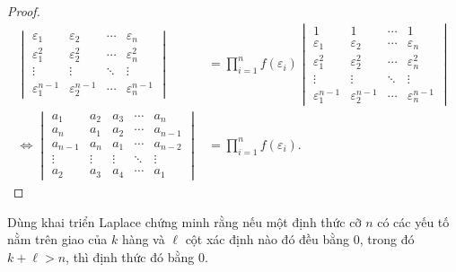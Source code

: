 \documentclass[class=linearalgebra,crop=false]{standalone}
\begin{document}
\begin{proof}
\begin{align*}
\begin{vmatrix}
            \varepsilon_{1}       & \varepsilon_{2}       & \cdots & \varepsilon_{n}       \\
            \varepsilon_{1}^{2}   & \varepsilon_{2}^{2}   & \cdots & \varepsilon_{n}^{2}   \\
            \vdots                & \vdots                & \ddots & \vdots                \\
            \varepsilon_{1}^{n-1} & \varepsilon_{2}^{n-1} & \cdots & \varepsilon_{n}^{n-1}
        \end{vmatrix}
         & =
        \prod^{n}_{i=1}f(\varepsilon_{i})
        \begin{vmatrix}
            1                     & 1                     & \cdots & 1                     \\
            \varepsilon_{1}       & \varepsilon_{2}       & \cdots & \varepsilon_{n}       \\
            \varepsilon_{1}^{2}   & \varepsilon_{2}^{2}   & \cdots & \varepsilon_{n}^{2}   \\
            \vdots                & \vdots                & \ddots & \vdots                \\
            \varepsilon_{1}^{n-1} & \varepsilon_{2}^{n-1} & \cdots & \varepsilon_{n}^{n-1}
        \end{vmatrix} \\
        \Leftrightarrow
        \begin{vmatrix}
            a_{1}   & a_{2}  & a_{3}  & \cdots & a_{n}   \\
            a_{n}   & a_{1}  & a_{2}  & \cdots & a_{n-1} \\
            a_{n-1} & a_{n}  & a_{1}  & \cdots & a_{n-2} \\
            \vdots  & \vdots & \vdots & \ddots & \vdots  \\
            a_{2}   & a_{3}  & a_{4}  & \cdots & a_{1}
        \end{vmatrix}
         & =
        \prod^{n}_{i=1}f(\varepsilon_{i}).
    \end{align*}
\end{proof}

\begin{exercise}
    \par Dùng khai triển Laplace chứng minh rằng nếu một định thức cỡ $n$ có các yếu tố nằm trên giao của $k$ hàng và $\ell$ cột xác định nào đó đều bằng 0, trong đó $k + \ell > n$, thì định thức đó bằng 0.
\end{exercise}
\end{document}
